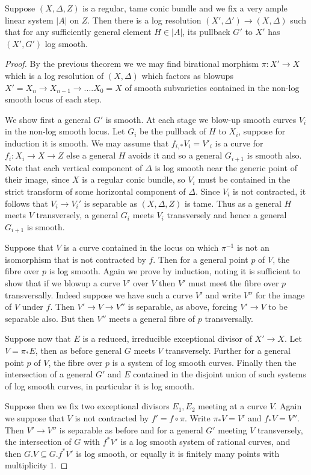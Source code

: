 \documentclass[a4paper,12pt]{book}
\begin{document}
\begin{corollary}
	Suppose $(X,\Delta,Z)$ is a regular, tame conic bundle and we fix a very ample linear system $|A|$ on $Z$.  Then there is a log resolution $(X',\Delta') \to (X,\Delta)$ such that for any sufficiently general element $H\in |A|$, its pullback $G'$ to $X'$ has $(X',G')$ log smooth.
\end{corollary}
\begin{proof}
	
	By the previous theorem we we may find birational morphism $\pi\colon X' \to X$ which is a log resolution of $(X,\Delta)$ which factors as blowups $X'=X_{n} \to X_{n-1} \to .... X_{0}=X$ of smooth subvarieties contained in the non-log smooth locus of each step.
	
	We show first a general $G'$ is smooth. At each stage we blow-up smooth curves $V_{i}$ in the non-log smooth locus. Let $G_{i}$ be the pullback of $H$ to $X_{i}$, suppose for induction it is smooth. We may assume that $f_{i,*}V_{i}=V'_{i}$ is a curve for $f_{i}\colon X_{i} \to X \to Z$ else a general $H$ avoids it and so a general $G_{i+1}$ is smooth also. Note that each vertical component of $\Delta$ is log smooth near the generic point of their image, since $X$ is a regular conic bundle, so $V_{i}$ must be contained in the strict transform of some horizontal component of $\Delta$. Since $V_{i}$ is not contracted, it follows that $V_{i} \to V_{i}'$ is separable as $(X,\Delta,Z)$ is tame. Thus as a general $H$ meets $V$ transversely, a general $G_{i}$ meets $V_{i}$ transversely and hence a general $G_{i+1}$ is smooth.
	
	Suppose that $V$ is a curve contained in the locus on which $\pi^{-1}$ is not an isomorphism that is not contracted by $f$. Then for a general point $p$ of $V$, the fibre over $p$ is log smooth. Again we prove by induction, noting it is sufficient to show that if we blowup a curve $V'$ over $V$ then $V'$ must meet the fibre over $p$ transversally. Indeed suppose we have such a curve $V'$ and write $V''$ for the image of $V$ under $f$. Then $V' \to V \to V''$ is separable, as above, forcing $V' \to V$ to be separable also. But then $V''$ meets a general fibre of $p$ transversally.
	
	Suppose now that $E$ is a reduced, irreducible exceptional divisor of $X'\to X$. Let $V=\pi_{*}E$, then as before general $G$ meets $V$ transversely. Further for a general point $p$ of $V$, the fibre over $p$ is a system of log smooth curves. Finally then the intersection of a general $G'$ and $E$ contained in the disjoint union of such systems of log smooth curves, in particular it is log smooth. 
	
	Suppose then we fix two exceptional divisors $E_{1},E_{2}$ meeting at a curve $V$. Again we suppose that $V$ is not contracted by $f'=f \circ \pi$. Write $\pi_{*}V=V'$ and $f_{*}V=V''$. Then $V' \to V''$ is separable as before and for a general $G'$ meeting $V$ transversely, the intersection of $G$ with $f^{*}V'$ is a log smooth system of rational curves, and then $G.V \subseteq G.f^{*}V'$ is log smooth, or equally it is finitely many points with multiplicity $1$. 
\end{proof}
\end{document}
